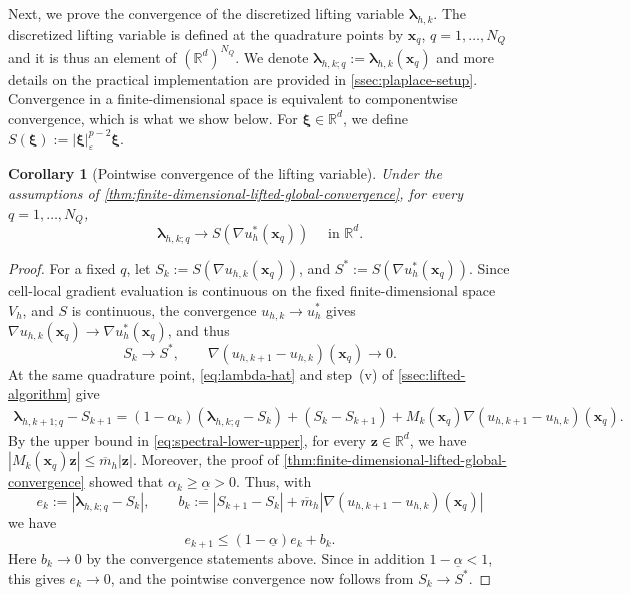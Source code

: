 \documentclass[11pt,pdflatex,sn-mathphys-num]{sn-jnl}
\theoremstyle{thmstyleone}%
\newtheorem{corollary}[theorem]{Corollary}%
\theoremstyle{thmstyletwo}%
\theoremstyle{thmstylethree}%
\newcommand{\bs}[1]{\ensuremath{\boldsymbol{#1}}}
\begin{document}
Next, we prove the convergence of the discretized lifting variable $\bs \lambda_{h,k}$. The discretized lifting variable is defined at the quadrature points by $\bs x_q$, $q=1,\ldots,N_Q$ and it is thus an element of $(\mathbb R^d)^{N_Q}$. We denote 
$\bs\lambda_{h,k;q}:=\bs\lambda_{h,k}(\bs x_q)$ and more details on the practical implementation are provided in \cref{ssec:plaplace-setup}. Convergence in a finite-dimensional space is equivalent to componentwise convergence, which is what we show below. For $\bs\xi\in\mathbb R^d$, we define
$  S(\bs\xi):=|\bs\xi|_\varepsilon^{p-2}\bs\xi$.

\begin{corollary}[Pointwise convergence of the lifting variable]
\label{cor:quadrature-flux-convergence}
Under the assumptions of \cref{thm:finite-dimensional-lifted-global-convergence}, for every $q=1,\ldots,N_Q$,
\begin{equation*}
  \bs\lambda_{h,k;q}
  \longrightarrow
  S\left(\nabla u_h^*(\bs x_q)\right)
  \quad\text{ in }\mathbb R^d.
\end{equation*}
\end{corollary}
\begin{proof}
For a fixed $q$, let $S_k:=S(\nabla u_{h,k}(\bs x_q))$, and $S^*:=S\left(\nabla u_h^*(\bs x_q)\right)$. Since cell-local gradient
evaluation is continuous on the fixed finite-dimensional space $V_h$, and
$S$ is continuous, the convergence $u_{h,k}\to u_h^*$ gives $\nabla u_{h,k}(\bs x_q)\to \nabla u_h^*(\bs x_q)$, and thus
\begin{equation*}
  S_k\to S^*,
  \qquad
  \nabla(u_{h,k+1}-u_{h,k})(\bs x_q)\to0.
\end{equation*}
At the same quadrature point, \eqref{eq:lambda-hat} and step~(v) of
\cref{ssec:lifted-algorithm} give
\begin{align*}
  \bs\lambda_{h,k+1;q}-S_{k+1}
  =(1-\alpha_k)(\bs\lambda_{h,k;q}-S_k)+(S_k-S_{k+1})+M_k(\bs x_q)\nabla(u_{h,k+1}-u_{h,k})(\bs x_q).
\end{align*}
By the upper bound in \eqref{eq:spectral-lower-upper}, for every $\bs z\in\mathbb R^d$, we have $|M_k(\bs x_q)\bs z|\le \overline m_h|\bs z|$. Moreover, the proof of \cref{thm:finite-dimensional-lifted-global-convergence} showed that
$\alpha_k\ge\underline\alpha>0$.
Thus, with
\begin{equation*}
    e_k:=|\bs\lambda_{h,k;q}-S_k|, \qquad b_k:=|S_{k+1}-S_k|+\overline m_h\left|\nabla(u_{h,k+1}-u_{h,k})(\bs x_q)\right|
\end{equation*}
we have
\begin{equation}\label{eq:Ek-recursion}
    e_{k+1} \le (1-\underline\alpha)e_k+b_k.
\end{equation}
Here $b_k\to0$ by the convergence statements above. Since in addition $1-\underline\alpha<1$, this gives $e_k\to0$, and the pointwise convergence now follows from $S_k\to S^*$.
\end{proof}
\end{document}
